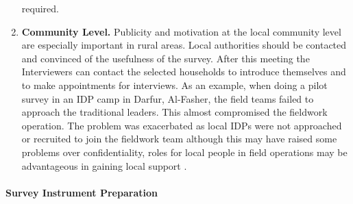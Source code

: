 \documentclass[
]{article}
\begin{document}
\begin{enumerate}
  required.
\item
  \textbf{Community Level.} Publicity and motivation at the local
  community level are especially important in rural areas. Local
  authorities should be contacted and convinced of the usefulness of
  the survey. After this meeting the Interviewers can contact the
  selected households to introduce themselves and to make appointments
  for interviews. As an example, when doing a pilot survey in an IDP
  camp in Darfur, Al-Fasher, the field teams failed to approach the
  traditional leaders. This almost compromised the fieldwork
  operation. The problem was exacerbated as local IDPs were not
  approached or recruited to join the fieldwork team although this may
  have raised some problems over confidentiality, roles for local
  people in field operations may be advantageous in gaining local
  support .
\end{enumerate}

\hypertarget{survey-instrument-preparation-1}{%
\paragraph{Survey Instrument Preparation}\label{survey-instrument-preparation-1}}
\end{document}

